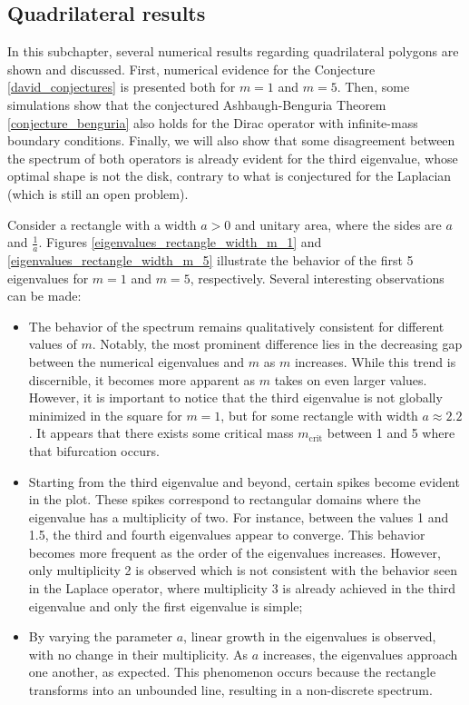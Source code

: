 \subsection{Quadrilateral results}

In this subchapter, several numerical results regarding quadrilateral polygons are shown and discussed. First, numerical evidence for the Conjecture \ref{david_conjectures} is presented both for \(m=1\) and \(m=5\). Then, some simulations show that the conjectured Ashbaugh-Benguria Theorem \ref{conjecture_benguria} also holds for the Dirac operator with infinite-mass boundary conditions. Finally, we will also show that some disagreement between the spectrum of both operators is already evident for the third eigenvalue, whose optimal shape is not the disk, contrary to what is conjectured for the Laplacian (which is still an open problem).

Consider a rectangle with a width \(a > 0\) and unitary area, where the sides are \(a\) and \(\frac{1}{a}\). Figures \ref{eigenvalues_rectangle_width_m_1} and \ref{eigenvalues_rectangle_width_m_5} illustrate the behavior of the first 5 eigenvalues for \(m=1\) and \(m=5\), respectively. Several interesting observations can be made:

\begin{itemize}
  \item The behavior of the spectrum remains qualitatively consistent for different values of \(m\). Notably, the most prominent difference lies in the decreasing gap between the numerical eigenvalues and \(m\) as \(m\) increases. While this trend is discernible, it becomes more apparent as \(m\) takes on even larger values. However, it is important to notice that the third eigenvalue is not globally minimized in the square for \(m=1\), but for some rectangle with width \(a \approx 2.2\). It appears that there exists some critical mass \(m_{\text{crit}}\) between 1 and 5 where that bifurcation occurs. 
  
  \item Starting from the third eigenvalue and beyond, certain spikes become evident in the plot. These spikes correspond to rectangular domains where the eigenvalue has a multiplicity of two. For instance, between the values 1 and 1.5, the third and fourth eigenvalues appear to converge. This behavior becomes more frequent as the order of the eigenvalues increases. However, only multiplicity 2 is observed which is not consistent with the behavior seen in the Laplace operator, where multiplicity 3 is already achieved in the third eigenvalue and only the first eigenvalue is simple;
  
  \item By varying the parameter \(a\), linear growth in the eigenvalues is observed, with no change in their multiplicity. As \(a\) increases, the eigenvalues approach one another, as expected. This phenomenon occurs because the rectangle transforms into an unbounded line, resulting in a non-discrete spectrum.
\end{itemize}

